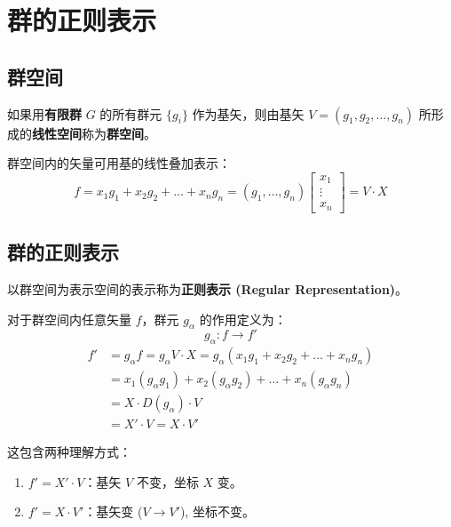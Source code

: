 

\section{群的正则表示}

\subsection{群空间}
如果用\textbf{有限群} $G$ 的所有群元 $\{g_i\}$ 作为基矢，则由基矢 $V = (g_1, g_2, \dots, g_n)$ 所形成的\textbf{线性空间}称为\textbf{群空间}。

群空间内的矢量可用基的线性叠加表示：
\begin{equation}
    f = x_1 g_1 + x_2 g_2 + \dots + x_n g_n = (g_1, \dots, g_n) \begin{bmatrix} x_1 \\ \vdots \\ x_n \end{bmatrix} = V \cdot X
\end{equation}

\subsection{群的正则表示}
以群空间为表示空间的表示称为\textbf{正则表示 (Regular Representation)}。

对于群空间内任意矢量 $f$，群元 $g_\alpha$ 的作用定义为：
\begin{equation}
    g_\alpha: f \to f'
\end{equation}
\begin{equation}
    \begin{aligned}
        f' &= g_\alpha f = g_\alpha V \cdot X = g_\alpha (x_1 g_1 + x_2 g_2 + \dots + x_n g_n) \\
        &= x_1 (g_\alpha g_1) + x_2 (g_\alpha g_2) + \dots + x_n (g_\alpha g_n) \\
        &= X \cdot D(g_\alpha) \cdot V \\
        &= X' \cdot V = X \cdot V'
    \end{aligned}
\end{equation}

这包含两种理解方式：
\begin{enumerate}
    \item $f' = X' \cdot V$：基矢 $V$ 不变，坐标 $X$ 变。
    \item $f' = X \cdot V'$：基矢变 ($V \to V'$), 坐标不变。
\end{enumerate}


